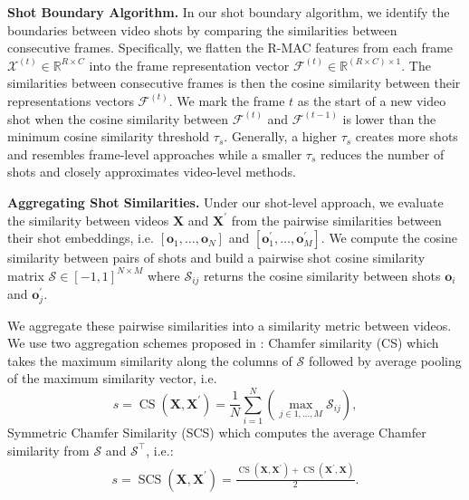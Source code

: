\documentclass[letterpaper]{article} \usepackage{aaai22}  \usepackage{times}  \usepackage{helvet}  \usepackage{courier}  \usepackage[hyphens]{url}  \usepackage{graphicx} \urlstyle{rm} \usepackage{amsmath}
\begin{document}
\textbf{\label{sect:sba}Shot Boundary Algorithm.} In our shot boundary algorithm, we identify the boundaries between video shots by comparing the similarities between consecutive frames. Specifically, we flatten the R-MAC features from each frame $\mathcal{X}^{(t)} \in \mathbb{R}^{R \times C}$ into the frame representation vector $\mathcal{F}^{(t)} \in \mathbb{R}^{(R\times C)\times1}$. The similarities between consecutive frames is then the cosine similarity between their representations vectors $\mathcal{F}^{(t)}$. We mark the frame $t$ as the start of a new video shot when the cosine similarity between $\mathcal{F}^{(t)}$ and $\mathcal{F}^{(t-1)}$ is lower than the minimum cosine similarity threshold $\tau_s$. Generally, a higher $\tau_s$ creates more shots and resembles frame-level approaches while a smaller $\tau_s$ reduces the number of shots and closely approximates video-level methods.

\textbf{\label{sect:aggregate-shots}Aggregating Shot Similarities.} Under our shot-level approach, we evaluate the similarity between videos $\mathbf{X}$ and $\mathbf{X}^\prime$ from the pairwise similarities between their shot embeddings, i.e. $\left[\mathbf{o}_1, \ldots, \mathbf{o}_N\right]$ and $\left[\mathbf{o}_1^\prime, \ldots, \mathbf{o}_M^\prime\right]$. We compute the cosine similarity between pairs of shots and build a pairwise shot cosine similarity matrix $\mathcal{S} \in [-1, 1]^{N \times M}$ where $\mathcal{S}_{ij}$ returns the cosine similarity between shots $\mathbf{o}_i$ and $\mathbf{o}_j^\prime$.

We aggregate these pairwise similarities into a similarity metric between videos. We use two aggregation schemes proposed in \cite{kordopatiszilos2019visil}: Chamfer similarity (CS) which takes the maximum similarity along the columns of $\mathcal{S}$ followed by average pooling of the maximum similarity vector, i.e. 
\begin{equation}
    s = \operatorname{CS}(\mathbf{X}, \mathbf{X}^\prime)=\frac{1}{N}\sum_{i=1}^N \left(\max_{j \in 1, \ldots, M} \mathcal{S}_{ij}  \right),
\end{equation}
Symmetric Chamfer Similarity (SCS) which computes the average Chamfer similarity from $\mathcal{S}$ and $\mathcal{S^\top}$, i.e.:
\begin{equation}
    \begin{aligned}
    s = \operatorname{SCS}(\mathbf{X}, \mathbf{X}^\prime) = \frac{\operatorname{CS}(\mathbf{X}, \mathbf{X}^\prime) + \operatorname{CS}(\mathbf{X}^\prime, \mathbf{X})}{2}.
    \end{aligned}
\end{equation}
\end{document}
